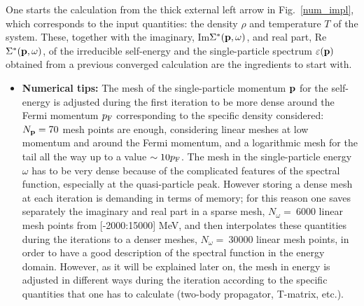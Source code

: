 One starts the calculation from the thick external left arrow in Fig.~\ref{num_impl}, which corresponds to the input quantities: the density $\rho$ and temperature $T$ of the system. These, together with the imaginary, Im$\Sigma^*({\bf p},\omega)$, and real part, Re$\Sigma^*({\bf p},\omega)$, of the irreducible self-energy and the single-particle spectrum $\varepsilon({\bf p})$ obtained from a previous converged calculation are the ingredients to start with. 
\begin{itemize}
\item {\bf Numerical tips:}
The mesh of the single-particle momentum ${\bf p}$ for the self-energy is adjusted during the first iteration to be more dense around the Fermi momentum $p_{\rm F}$ corresponding to the specific density considered: $N_{\bf p}=70$ mesh points are enough, considering linear meshes at low momentum and around the Fermi momentum, and a logarithmic mesh for the tail all the way up to a value $\sim10p_{\rm F}$. The mesh in the single-particle energy $\omega$ has to be very dense because of the complicated features of the spectral function, especially at the quasi-particle peak. However storing a dense mesh at each iteration is demanding in terms of memory; for this reason one saves separately the imaginary and real part in a sparse mesh, $N_{\omega}=~6000$ linear mesh points from [-2000:15000] MeV, and then interpolates these quantities during the iterations to a denser meshes, $N_{\omega}=~30000$ linear mesh points, in order to have a good description of the spectral function in the energy domain. However, as it will be explained later on, the mesh in energy is adjusted in different ways during the iteration according to the specific quantities that one has to calculate (two-body propagator, T-matrix, etc.).
\end{itemize}

